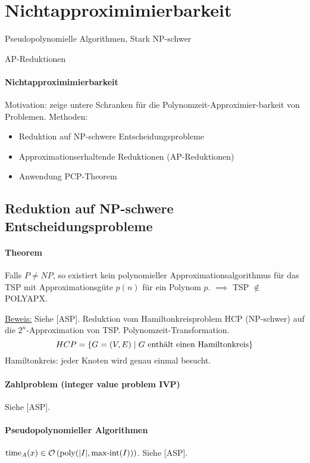 \section{Nichtapproximimierbarkeit}

\begin{takeaway}
    \item Pseudopolynomielle Algorithmen, Stark NP-schwer
    \item AP-Reduktionen
\end{takeaway}

\paragraph{Nichtapproximimierbarkeit}
Motivation: zeige untere Schranken für die Polynomzeit-Approximier-barkeit von Problemen.
Methoden:
\begin{itemize}
    \item Reduktion auf NP-schwere Entscheidungsprobleme
    \item Approximationserhaltende Reduktionen (AP-Reduktionen)
    \item Anwendung PCP-Theorem
\end{itemize}


\subsection{Reduktion auf NP-schwere Entscheidungsprobleme}

\paragraph{Theorem}
Falls $P \neq NP$, so existiert kein polynomieller Approximationsalgorithmus für das TSP
mit Approximationsgüte $p(n)$ für ein Polynom $p$.
$\implies$ TSP $\notin$ POLYAPX.

\underline{Beweis:}
Siehe [ASP]. Reduktion vom Hamiltonkreisproblem HCP (NP-schwer) auf die $2^n$-Approximation von TSP.
Polynomzeit-Transformation.
$$ HCP = \{ G=(V,E) \; | \; G \text{ enthält einen Hamiltonkreis} \} $$
Hamiltonkreis: jeder Knoten wird genau einmal besucht.

\paragraph{Zahlproblem (integer value problem IVP)}
Siehe [ASP].

\paragraph{Pseudopolynomieller Algorithmen}
$\text{time}_A(x) \in \mathcal{O} \left( \text{poly}( |I|, \text{max-int}(I) ) \right)$.
Siehe [ASP].

